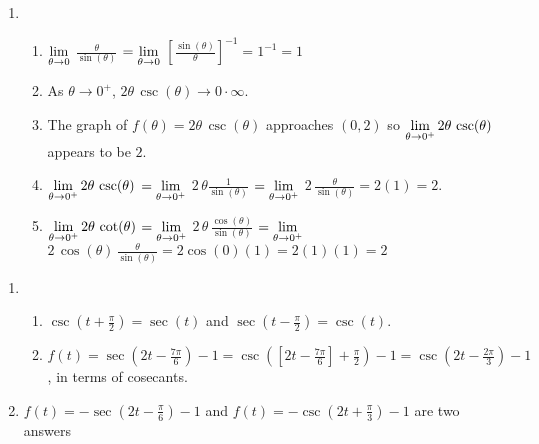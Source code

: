 \begin{enumerate}
\setcounter{enumi}{\value{HW}}

\item \begin{enumerate} \item $\displaystyle{\lim_{\theta \rightarrow 0}}$ $\frac{\theta}{\sin(\theta)}$ $ = \displaystyle{\lim_{\theta \rightarrow 0}}$ $\left[\frac{\sin(\theta)}{\theta}\right]^{-1} = 1^{-1} = 1$

\smallskip


\item   As $\theta \rightarrow 0^{+}$, $2 \theta \, \csc(\theta) \rightarrow 0 \cdot \infty$.

\smallskip

\item  The graph of  $f(\theta) = 2 \theta \, \csc(\theta)$ approaches $(0,2)$ so  $\displaystyle{\lim_{\theta \rightarrow 0^{+}} 2 \theta \, \csc(\theta)}$ appears to be $2$.

\smallskip

\item  $\displaystyle{\lim_{\theta \rightarrow 0^{+}} 2 \theta \, \csc(\theta)}$ $= \displaystyle{\lim_{\theta \rightarrow 0^{+}}}$ $2 \, \theta \frac{1}{\sin(\theta)}$ $= \displaystyle{\lim_{\theta \rightarrow 0^{+}}}$ $2 \, \frac{\theta}{\sin(\theta)} = 2(1) = 2$.

\item $\displaystyle{\lim_{\theta \rightarrow 0^{+}} 2 \theta \, \cot(\theta)}$ $= \displaystyle{\lim_{\theta \rightarrow 0^{+}}}$ $2 \, \theta \, \frac{\cos(\theta)}{\sin(\theta)}$  $= \displaystyle{\lim_{\theta \rightarrow 0^{+}}}$ $2 \, \cos(\theta) \, \frac{\theta}{\sin(\theta)} = 2\cos(0)(1) = 2(1)(1) = 2$

\end{enumerate}

\setcounter{HW}{\value{enumi}}
\end{enumerate}

\begin{enumerate}
\setcounter{enumi}{\value{HW}}

\item   \begin{enumerate} \item  $\csc\left(t + \frac{\pi}{2} \right) = \sec(t)$ and $\sec\left(t - \frac{\pi}{2} \right) = \csc(t)$.

\item  $f(t) = \sec\left( 2 t - \frac{7\pi}{6} \right) -1 = \csc\left( \left[2 t - \frac{7\pi}{6}\right] + \frac{\pi}{2}  \right) -1 = \csc\left( 2 t - \frac{2\pi}{3} \right) -1 $, in terms of cosecants.

\end{enumerate}

\item  $f(t) = - \sec\left(2t - \frac{\pi}{6} \right)-1$ and  $f(t) = -\csc\left(2t + \frac{\pi}{3} \right) -1$ are two answers

\setcounter{HW}{\value{enumi}}
\end{enumerate}


